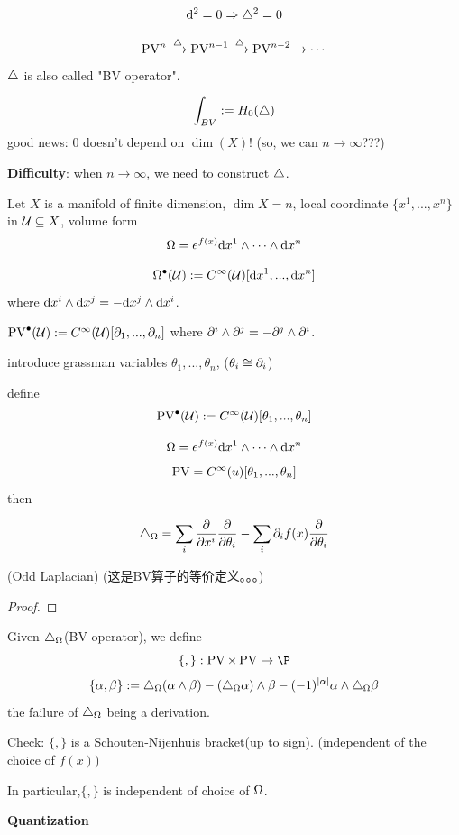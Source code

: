 $$\mathrm{d}^2=0\Rightarrow\triangle^2=0$$

$$\operatorname{PV}^n\xrightarrow{\triangle}\operatorname{PV}^{n-1}\xrightarrow{\triangle}\operatorname{PV}^{n-2}\to\cdots$$
$\triangle$ is also called "BV operator".

$$\int_{BV}:=H_0(\triangle)$$
good news: $0$ doesn't depend on $\dim(X)$!
(so, we can $n\to\infty$???)

\textbf{Difficulty}: when $n\to\infty$, we need to construct $\triangle$.

\begin{example}
Let $X$ is a manifold of finite dimension, $\dim X=n$,
local coordinate $\{x^1,...,x^n\}$ in $\mathcal{U}\subseteq X$,
volume form
$$\Omega=e^{f(x)}\mathrm{d} x^1\wedge\cdots\wedge\mathrm{d} x^n$$

$$\Omega^{\bullet}(\mathcal{U}):=C^{\infty}(\mathcal{U})[\mathrm{d} x^1,...,\mathrm{d} x^n]$$
where $\mathrm{d} x^i\wedge\mathrm{d} x^j=-\mathrm{d} x^j\wedge\mathrm{d} x^i$.

$\operatorname{PV}^{\bullet}(\mathcal{U}):=C^{\infty}(\mathcal{U})[\partial_1,...,\partial_n]$
 where $\partial^i\wedge\partial^j=-\partial^j\wedge\partial^i$.
\end{example}

introduce grassman variables $\theta_1,...,\theta_n$,
($\theta _i\cong \partial_i$)

define
$$\operatorname{PV}^{\bullet}(\mathcal{U}):=C^{\infty}(\mathcal{U})[\theta_1,...,\theta_n]$$


\begin{prop}
$$\Omega=e^{f(x)}\mathrm{d} x^1\wedge\cdots\wedge \mathrm{d} x^n$$
$$\operatorname{PV}=C^{\infty}(u)[\theta_1,...,\theta_n]$$
then

$$\triangle_{\Omega}=\sum_{i}\frac{\partial } {\partial x^i}\frac{\partial } {\partial \theta_i}
-\sum_{i}\partial_if(x)\frac{\partial } {\partial \theta_i}$$

(Odd Laplacian)
(这是BV算子的等价定义。。。)
\end{prop}

\begin{proof}
\end{proof}


\begin{definition}
Given $\triangle_{\Omega}$(BV operator), we define
$$\{,\}:\PV\times\PV\to\P$$
$$\{\alpha,\beta\}:=
\triangle_{\Omega}(\alpha\wedge\beta)-(\triangle_{\Omega}\alpha)\wedge\beta-
(-1)^{|\alpha|}\alpha\wedge\triangle_{\Omega}\beta$$
the failure of $\triangle_{\Omega}$ being a derivation.
\end{definition}
Check: $\{,\}$ is a Schouten-Nijenhuis bracket(up to sign).
(independent of the choice of $f(x)$)

In particular,$\{,\}$ is independent of choice of $\Omega$.

\textbf{Quantization}

